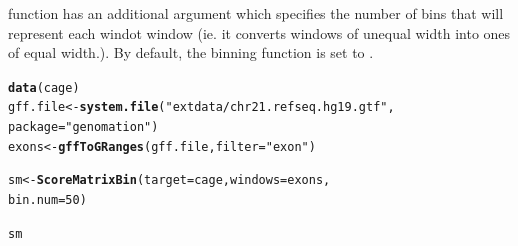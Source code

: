 \documentclass{article}\usepackage[]{graphicx}\usepackage[]{color}
\makeatletter
\newcommand{\hlnum}[1]{\textcolor[rgb]{0.686,0.059,0.569}{#1}}%
\newcommand{\hlstr}[1]{\textcolor[rgb]{0.192,0.494,0.8}{#1}}%
\newcommand{\hlstd}[1]{\textcolor[rgb]{0.345,0.345,0.345}{#1}}%
\newcommand{\hlkwb}[1]{\textcolor[rgb]{0.69,0.353,0.396}{#1}}%
\newcommand{\hlkwc}[1]{\textcolor[rgb]{0.333,0.667,0.333}{#1}}%
\newcommand{\hlkwd}[1]{\textcolor[rgb]{0.737,0.353,0.396}{\textbf{#1}}}%
\newenvironment{kframe}{%
 \def\at@end@of@kframe{}%
 \ifinner\ifhmode%
  \def\at@end@of@kframe{\end{minipage}}%
  \begin{minipage}{\columnwidth}%
 \fi\fi%
 \def\FrameCommand##1{\hskip\@totalleftmargin \hskip-\fboxsep
 \colorbox{shadecolor}{##1}\hskip-\fboxsep
     \hskip-\linewidth \hskip-\@totalleftmargin \hskip\columnwidth}%
 \MakeFramed {\advance\hsize-\width
   \@totalleftmargin\z@ \linewidth\hsize
   \@setminipage}}%
 {\par\unskip\endMakeFramed%
 \at@end@of@kframe}
\newenvironment{knitrout}{}{} %
\makeatother
\begin{document}
 function has an additional  argument which
specifies the number of bins that will represent each windot window  (ie. it converts windows
of unequal width into ones of equal width.). By default, the binning function is set
to .
\begin{knitrout}
\color{fgcolor}\begin{kframe}
\begin{alltt}
\hlkwd{data}\hlstd{(cage)}
\hlstd{gff.file} \hlkwb{<-} \hlkwd{system.file}\hlstd{(}\hlstr{"extdata/chr21.refseq.hg19.gtf"}\hlstd{,}
    \hlkwc{package} \hlstd{=} \hlstr{"genomation"}\hlstd{)}
\hlstd{exons} \hlkwb{<-} \hlkwd{gffToGRanges}\hlstd{(gff.file,} \hlkwc{filter} \hlstd{=} \hlstr{"exon"}\hlstd{)}
\end{alltt}


{\ttfamily\noindent\itshape\color{messagecolor}{\#\# Filtering exon features...}}\begin{alltt}
\hlstd{sm} \hlkwb{<-} \hlkwd{ScoreMatrixBin}\hlstd{(}\hlkwc{target} \hlstd{= cage,} \hlkwc{windows} \hlstd{= exons,}
    \hlkwc{bin.num} \hlstd{=} \hlnum{50}\hlstd{)}
\end{alltt}


{\ttfamily\noindent\color{warningcolor}{\#\# Warning: supplied GRanges object contains ranges of width < number of bins}}\begin{alltt}
\hlstd{sm}
\end{alltt}


{\ttfamily\noindent\itshape\color{messagecolor}{\#\#\ \  scoreMatrix with dims: 5127 50}}\end{kframe}
\end{knitrout}
\end{document}
